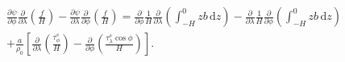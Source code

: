 
\begin{equation}
\begin{split}
    \frac{\partial\psi}{\partial\phi}\frac{\partial}{\partial\lambda}\left(\frac{f}{H}\right) - \frac{\partial\psi}{\partial\lambda}\frac{\partial}{\partial\phi}\left(\frac{f}{H}\right) 
    = \frac{\partial}{\partial\phi}\frac{1}{H}\frac{\partial}{\partial\lambda}\left(\int_{-H}^0zb\, \text{d}z\right) - \frac{\partial}{\partial\lambda}\frac{1}{H}\frac{\partial}{\partial\phi}\left(\int_{-H}^0zb\, \text{d}z\right)  \\
    + \frac{a}{\rho_0}\left[\frac{\partial}{\partial\lambda}\left(\frac{\tau_\phi^s}{H}\right)-\frac{\partial}{\partial\phi}\left(\frac{\tau_\lambda^s\cos\phi}{H}\right)\right].
\end{split}
\label{EQN:FullCrossDifferential}
\end{equation}
